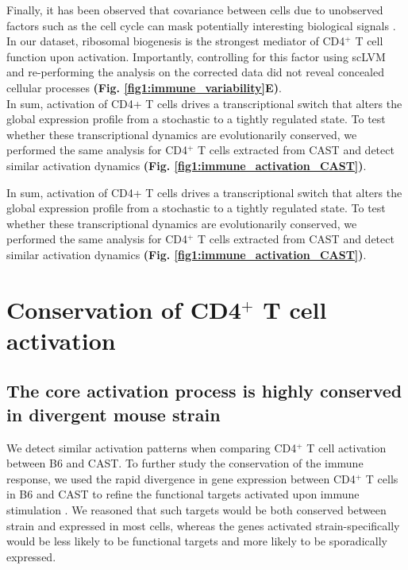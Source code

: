 Finally, it has been observed that covariance between cells due to unobserved factors such as the cell cycle can mask potentially interesting biological signals \citep{Stegle2015}. In our dataset, ribosomal biogenesis is the strongest mediator of CD4$^+$ T cell function upon activation. Importantly, controlling for this factor using scLVM \citep{Buettner2015} and re-performing the analysis on the corrected data did not reveal concealed cellular processes \textbf{(Fig. \ref{fig1:immune_variability}E)}.\\

In sum, activation of CD4+ T cells drives a transcriptional switch that alters the global expression profile from a stochastic to a tightly regulated state. To test whether these transcriptional dynamics are evolutionarily conserved, we performed the same analysis for CD4$^+$ T cells extracted from CAST and detect similar activation dynamics \textbf{(Fig. \ref{fig1:immune_activation_CAST})}.



In sum, activation of CD4+ T cells drives a transcriptional switch that alters the global expression profile from a stochastic to a tightly regulated state. To test whether these transcriptional dynamics are evolutionarily conserved, we performed the same analysis for CD4$^+$ T cells extracted from CAST and detect similar activation dynamics \textbf{(Fig. \ref{fig1:immune_activation_CAST})}.

\section{Conservation of CD4$^+$ T cell activation}
\subsection*{The core activation process is highly conserved in divergent mouse strain}

We detect similar activation patterns when comparing CD4$^+$ T cell activation between B6 and CAST. To further study the conservation of the immune response, we used the rapid divergence in gene expression between CD4$^+$ T cells in B6 and CAST to refine the functional targets activated upon immune stimulation \citep{Shay2013}. We reasoned that such targets would be both conserved between strain and expressed in most cells, whereas the genes activated strain-specifically would be less likely to be functional targets and more likely to be sporadically expressed.\\


